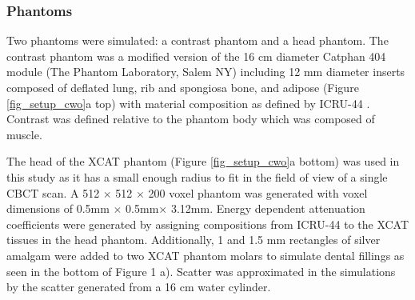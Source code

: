 

\subsubsection{Phantoms}

Two phantoms were simulated: a contrast phantom and a head phantom. The contrast phantom was a modified version of the 16 cm diameter Catphan 404 module (The Phantom Laboratory, Salem NY) including 12 mm diameter inserts composed of deflated lung, rib and spongiosa bone, and adipose (Figure \ref{fig_setup_cwo}a top) with material composition as defined by ICRU-44 \cite{White1989Report44}. Contrast was defined relative to the phantom body which was composed of muscle.

 
The head of the XCAT\cite{Segars20104DResearch} phantom (Figure \ref{fig_setup_cwo}a bottom) was used in this study as it has a small enough radius to fit in the field of view of a single CBCT scan. A 512 $\times$ 512 $\times$ 200 voxel phantom was generated with voxel dimensions of 0.5mm $\times$ 0.5mm$ \times$ 3.12mm. Energy dependent attenuation coefficients were generated by assigning compositions from ICRU-44 \cite{White1989Report44} to the XCAT tissues in the head phantom. Additionally, 1 and 1.5 mm rectangles of silver amalgam were added to two XCAT phantom molars to simulate dental fillings as seen in the bottom of Figure 1 a). Scatter was approximated in the simulations by the scatter generated from a 16 cm water cylinder.

